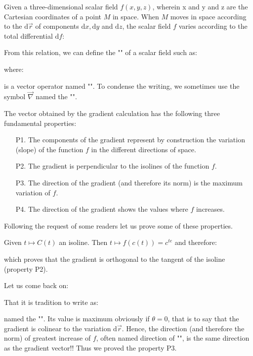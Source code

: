 	Given a three-dimensional scalar field $f(x,y,z)$, wherein x and y and z are the Cartesian coordinates of a point $M$ in space. When $M$ moves in space according to the $\mathrm{d}\vec{r}$ of components $\mathrm{d}x, \mathrm{d}y$ and $\mathrm{d}z$, the scalar field $f$ varies according to the total differential $\mathrm{d}f$:
	
	From this relation, we can define the "" of a scalar field such as:
	
	where:
	
	is a vector operator named "". To condense the writing, we sometimes use the symbol $\vec{\nabla}$ named the "".
	
	The vector obtained by the gradient calculation has the following three fundamental properties:
	\begin{enumerate}
		\item[P1.] The components of the gradient represent by construction the variation (slope) of the function $f$ in the different directions of space.
		
		\item[P2.] The gradient is perpendicular to the isolines of the function $f$.

		\item[P3.] The direction of the gradient (and therefore its norm) is the maximum variation of $f$.

		\item[P4.] The direction of the gradient shows the values where $f$ increases.
	\end{enumerate}
	\label{gradient normal}Following the request of some readers let us prove some of these properties.
	
	Given $t\mapsto C(t)$ an isoline. Then $t\mapsto f(c(t))=c^{te}$ and therefore:
	  
	which proves that the gradient is orthogonal to the tangent of the isoline (property P2).
	
	Let us come back on:
	
	That it is tradition to write as:
	
	named the "". Its value is maximum obviously if $\theta=0$, that is to say that the gradient is colinear to the variation $\mathrm{d}\vec{r}$. Hence, the direction (and therefore the norm) of greatest increase of $f$, often named direction of "\label{eepest ascent}", is the same direction as the gradient vector!! Thus we proved the property P3.
	
